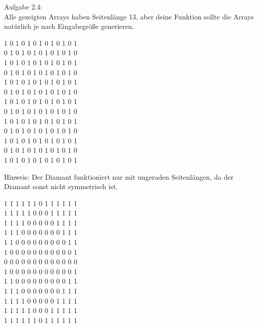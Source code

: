 \documentclass{../../sheet}
\begin{document}
\newpage
{}
\hypertarget{Aufgabe_4}{}
Aufgabe 2.4:\\
Alle gezeigten Arrays haben Seitenlänge 13, aber deine Funktion sollte die Arrays natürlich je nach Eingabegröße generieren.
\begin{ausgabe}
    1 0 1 0 1 0 1 0 1 0 1 0 1 \\
    0 1 0 1 0 1 0 1 0 1 0 1 0 \\
    1 0 1 0 1 0 1 0 1 0 1 0 1 \\
    0 1 0 1 0 1 0 1 0 1 0 1 0 \\
    1 0 1 0 1 0 1 0 1 0 1 0 1 \\
    0 1 0 1 0 1 0 1 0 1 0 1 0 \\
    1 0 1 0 1 0 1 0 1 0 1 0 1 \\
    0 1 0 1 0 1 0 1 0 1 0 1 0 \\
    1 0 1 0 1 0 1 0 1 0 1 0 1 \\
    0 1 0 1 0 1 0 1 0 1 0 1 0 \\
    1 0 1 0 1 0 1 0 1 0 1 0 1 \\
    0 1 0 1 0 1 0 1 0 1 0 1 0 \\
    1 0 1 0 1 0 1 0 1 0 1 0 1
\end{ausgabe}
Hinweis: Der Diamant funktioniert nur mit ungeraden Seitenlängen, da der Diamant sonst nicht symmetrisch ist.\\
\begin{ausgabe}
    1 1 1 1 1 1 0 1 1 1 1 1 1 \\
    1 1 1 1 1 0 0 0 1 1 1 1 1 \\
    1 1 1 1 0 0 0 0 0 1 1 1 1 \\
    1 1 1 0 0 0 0 0 0 0 1 1 1 \\
    1 1 0 0 0 0 0 0 0 0 0 1 1 \\
    1 0 0 0 0 0 0 0 0 0 0 0 1 \\
    0 0 0 0 0 0 0 0 0 0 0 0 0 \\
    1 0 0 0 0 0 0 0 0 0 0 0 1 \\
    1 1 0 0 0 0 0 0 0 0 0 1 1 \\
    1 1 1 0 0 0 0 0 0 0 1 1 1 \\
    1 1 1 1 0 0 0 0 0 1 1 1 1 \\
    1 1 1 1 1 0 0 0 1 1 1 1 1 \\
    1 1 1 1 1 1 0 1 1 1 1 1 1
\end{ausgabe}
\end{document}

